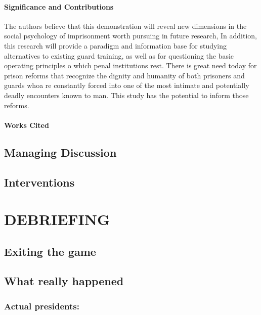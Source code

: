 \subsubsection{Significance and Contributions}
\label{significanceandcontributions}

The authors believe that this demonstration will reveal new dimensions in the social psychology of imprisonment worth pursuing in future research, In addition, this research will provide a paradigm and information base for studying alternatives to existing guard training, as well as for questioning the basic operating principles o which penal institutions rest. There is great need today for prison reforms that recognize the dignity and humanity of both prisoners and guards whoa re constantly forced into one of the most intimate and potentially deadly encounters known to man. This study has the potential to inform those reforms.

\subsubsection{Works Cited}
\label{workscited}

\section{Managing Discussion}
\label{managingdiscussion}

\section{Interventions}
\label{interventions}

\pagebreak 

\chapter{DEBRIEFING}
\label{debriefing}

\section{Exiting the game}
\label{exitingthegame}

\section{What really happened}
\label{whatreallyhappened}

\subsection{Actual presidents:}
\label{actualpresidents:}

